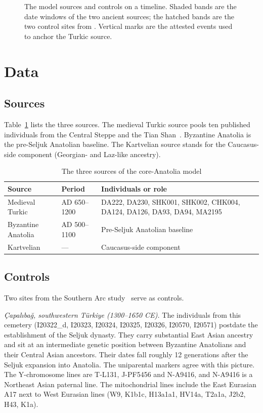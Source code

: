 \documentclass[conference,a4paper]{IEEEtran}
\begin{document}
\begin{figure}[t]
\centering

\caption{The model sources and controls on a timeline. Shaded bands are the date windows of the two ancient sources; the hatched bands are the two control sites from \cite{lazaridis2022}. Vertical marks are the attested events used to anchor the Turkic source.}
\label{fig:timeline}
\end{figure}

\section{Data}\label{sec:data}
\subsection{Sources}
Table~\ref{tab:sources} lists the three sources. The medieval Turkic source pools ten published individuals from the Central Steppe and the Tian Shan~\cite{damgaard2018steppes,damgaard2018horse,jeong2020}. Byzantine Anatolia is the pre-Seljuk Anatolian baseline. The Kartvelian source stands for the Caucasus-side component (Georgian- and Laz-like ancestry).

\begin{table}[t]
\centering
\caption{The three sources of the core-Anatolia model}
\label{tab:sources}
\small
\begin{tabular}{@{}>{\raggedright}p{}>{\raggedright}p{}>{\raggedright\arraybackslash}p{}@{}}
\toprule
Source & Period & Individuals or role \\
\midrule
Medieval Turkic & AD 650--1200 & DA222, DA230, SHK001, SHK002, CHK004, DA124, DA126, DA93, DA94, MA2195 \\
Byzantine Anatolia & AD 500--1100 & Pre-Seljuk Anatolian baseline \\
Kartvelian & --- & Caucasus-side component \\
\bottomrule
\end{tabular}
\end{table}

\subsection{Controls}
Two sites from the Southern Arc study~\cite{lazaridis2022} serve as controls.

\textit{Çapalıbağ, southwestern Türkiye (1300--1650 CE).} The individuals from this cemetery (I20322\_d, I20323, I20324, I20325, I20326, I20570, I20571) postdate the establishment of the Seljuk dynasty. They carry substantial East Asian ancestry and sit at an intermediate genetic position between Byzantine Anatolians and their Central Asian ancestors. Their dates fall roughly 12 generations after the Seljuk expansion into Anatolia. The uniparental markers agree with this picture. The Y-chromosome lines are T-L131, J-PF5456 and N-A9416, and N-A9416 is a Northeast Asian paternal line. The mitochondrial lines include the East Eurasian A17 next to West Eurasian lines (W9, K1b1c, H13a1a1, HV14a, T2a1a, J2b2, H43, K1a).
\end{document}

